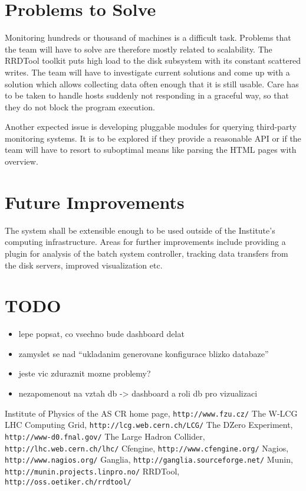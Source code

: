 \documentclass[12pt]{article}
\begin{document}
\section{Problems to Solve}

Monitoring hundreds or thousand of machines is a difficult task.  Problems that the team will have to solve are therefore mostly
related to scalability.  The RRDTool toolkit puts high load to the disk subsystem with its constant scattered writes.  The team
will have to investigate current solutions and come up with a solution which allows collecting data often enough that it is still
usable.  Care has to be taken to handle hosts suddenly not responding in a graceful way, so that they do not block the program
execution.

Another expected issue is developing pluggable modules for querying third-party monitoring systems.  It is to be explored if they
provide a reasonable API or if the team will have to resort to suboptimal means like parsing the HTML pages with overview.

\section{Future Improvements}

The system shall be extensible enough to be used outside of the Institute's computing infrastructure.  Areas for further
improvements include providing a plugin for analysis of the batch system controller, tracking data transfers from the disk
servers, improved visualization etc.

\section{TODO}

\begin{itemize}
    \item{lepe popsat, co vsechno bude dashboard delat}
    \item{zamyslet se nad ``ukladanim generovane konfigurace blizko databaze''}
    \item{jeste vic zduraznit mozne problemy?}
    \item{nezapomenout na vztah db -> dashboard a roli db pro vizualizaci}
\end{itemize}

\begin{thebibliography}{9}
    Institute of Physics of the AS CR home page, {\tt http://www.fzu.cz/}
    The W-LCG LHC Computing Grid, {\tt http://lcg.web.cern.ch/LCG/}
    The DZero Experiment, {\tt http://www-d0.fnal.gov/}
    The Large Hadron Collider, {\tt http://lhc.web.cern.ch/lhc/}
    Cfengine, {\tt http://www.cfengine.org/}
    Nagios, {\tt http://www.nagios.org/}
    Ganglia, {\tt http://ganglia.sourceforge.net/}
    Munin, {\tt http://munin.projects.linpro.no/}
    RRDTool, {\tt http://oss.oetiker.ch/rrdtool/}
\end{thebibliography}
\end{document}
